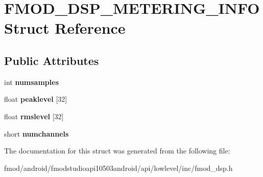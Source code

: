\hypertarget{struct_f_m_o_d___d_s_p___m_e_t_e_r_i_n_g___i_n_f_o}{\section{F\+M\+O\+D\+\_\+\+D\+S\+P\+\_\+\+M\+E\+T\+E\+R\+I\+N\+G\+\_\+\+I\+N\+F\+O Struct Reference}
\label{struct_f_m_o_d___d_s_p___m_e_t_e_r_i_n_g___i_n_f_o}
}
\subsection*{Public Attributes}
\begin{DoxyCompactItemize}
\item 
\hypertarget{struct_f_m_o_d___d_s_p___m_e_t_e_r_i_n_g___i_n_f_o_a537ce40b7da3bd4a9b5c4c874e8520ff}{int {\bfseries numsamples}}\label{struct_f_m_o_d___d_s_p___m_e_t_e_r_i_n_g___i_n_f_o_a537ce40b7da3bd4a9b5c4c874e8520ff}

\item 
\hypertarget{struct_f_m_o_d___d_s_p___m_e_t_e_r_i_n_g___i_n_f_o_a800fa4abd8bee4066848a93f384ed59f}{float {\bfseries peaklevel} \mbox{[}32\mbox{]}}\label{struct_f_m_o_d___d_s_p___m_e_t_e_r_i_n_g___i_n_f_o_a800fa4abd8bee4066848a93f384ed59f}

\item 
\hypertarget{struct_f_m_o_d___d_s_p___m_e_t_e_r_i_n_g___i_n_f_o_ab8455d015f9718e7c86a2137439d9ada}{float {\bfseries rmslevel} \mbox{[}32\mbox{]}}\label{struct_f_m_o_d___d_s_p___m_e_t_e_r_i_n_g___i_n_f_o_ab8455d015f9718e7c86a2137439d9ada}

\item 
\hypertarget{struct_f_m_o_d___d_s_p___m_e_t_e_r_i_n_g___i_n_f_o_ab657f26f81938d5a024ac1e2f0118ddd}{short {\bfseries numchannels}}\label{struct_f_m_o_d___d_s_p___m_e_t_e_r_i_n_g___i_n_f_o_ab657f26f81938d5a024ac1e2f0118ddd}

\end{DoxyCompactItemize}


The documentation for this struct was generated from the following file\+:\begin{DoxyCompactItemize}
\item 
fmod/android/fmodstudioapi10503android/api/lowlevel/inc/fmod\+\_\+dsp.\+h\end{DoxyCompactItemize}
